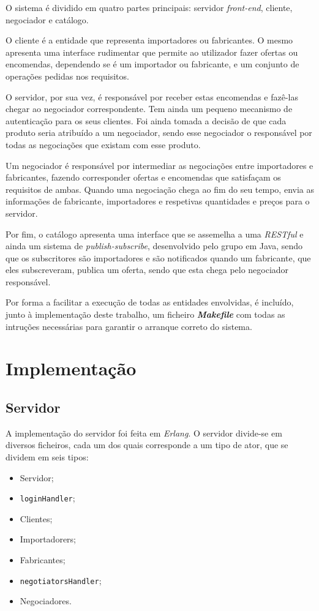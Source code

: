 \documentclass[a4paper]{report}
\begin{document}
	O sistema é dividido em quatro partes principais: servidor \textit{front-end}, cliente, negociador e catálogo.

	O cliente é a entidade que representa importadores ou fabricantes. 
	O mesmo apresenta uma interface rudimentar que permite ao utilizador fazer ofertas ou encomendas, dependendo se é um importador ou fabricante, e um conjunto de operações pedidas nos requisitos.
	
	O servidor, por sua vez, é responsável por receber estas encomendas e fazê-las chegar ao negociador correspondente. Tem ainda um pequeno mecanismo de autenticação para os seus clientes.
	Foi ainda tomada a decisão de que cada produto seria atribuído a um negociador, sendo esse negociador o responsável por todas as negociações que existam com esse produto.
	
	Um negociador é responsável por intermediar as negociações entre importadores e fabricantes, fazendo corresponder ofertas e encomendas que satisfaçam os requisitos de ambas.
	Quando uma negociação chega ao fim do seu tempo, envia as informações de fabricante, importadores e respetivas quantidades e preços para o servidor.

	Por fim, o catálogo apresenta uma interface que se assemelha a uma \textit{RESTful} e ainda um sistema de \textit{publish-subscribe}, desenvolvido pelo grupo em Java, sendo que os subscritores são importadores e são notificados quando um fabricante, que eles subscreveram, publica um oferta, sendo que esta chega pelo negociador responsável.

	Por forma a facilitar a execução de todas as entidades envolvidas, é incluído, junto à implementação deste trabalho, um ficheiro \textbf{\textit{Makefile}} com todas as intruções necessárias para garantir o arranque correto do sistema.

	\section{Implementação}
	
	\subsection{Servidor}
	A implementação do servidor foi feita em \textit{Erlang}. O servidor divide-se em diversos ficheiros, cada um dos quais corresponde a um tipo de ator, que se dividem em seis tipos:
	\begin{itemize}
		\item Servidor;
		\item \texttt{loginHandler};
		\item Clientes;
		\item Importadorers;
		\item Fabricantes;
		\item \texttt{negotiatorsHandler};
		\item Negociadores.
	\end{itemize}
\end{document}
